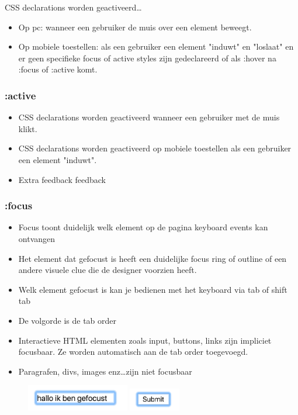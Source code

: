 \documentclass{article}
\begin{document}
CSS declarations worden geactiveerd\dots

\begin{itemize}
    \item Op pc: wanneer een gebruiker de muis over een element beweegt.
    \item Op mobiele toestellen: als een gebruiker een element "induwt" en "loslaat" en er geen specifieke focus of active styles zijn gedeclareerd of als :hover na :focus of :active komt.
\end{itemize}

\subsubsection{:active}

\begin{itemize}
    \item CSS declarations worden geactiveerd wanneer een gebruiker met de muis klikt.
    \item CSS declarations worden geactiveerd op mobiele toestellen als een gebruiker een element "induwt".
    \item Extra feedback feedback
\end{itemize}

\subsubsection{:focus}
\begin{itemize}
    \item Focus toont duidelijk welk element op de pagina keyboard events kan ontvangen
    \item Het element dat gefocust is heeft een duidelijke focus ring of outline of een andere visuele clue die de designer voorzien heeft.
    \item Welk element gefocust is kan je bedienen met het keyboard via tab of shift tab
    \item De volgorde is de tab order
    \item Interactieve HTML elementen zoals input, buttons, links zijn impliciet focusbaar. Ze worden automatisch aan de tab order toegevoegd.
    \item Paragrafen, divs, images enz\dots zijn niet focusbaar
\end{itemize}

\begin{figure}[H]
    \centering
    \includegraphics[width=0.4\textwidth]{focus.png}
    \includegraphics[width=0.2\textwidth]{focus2.png}
    \caption{}
\end{figure}
\end{document}
